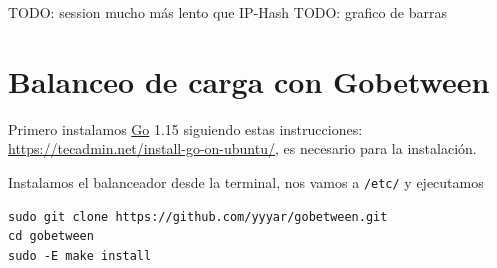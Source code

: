 \documentclass{article}
\begin{document}
TODO: session mucho más lento que IP-Hash
TODO: grafico de barras

\section{Balanceo de carga con Gobetween}

Primero instalamos \href{https://golang.org/}{Go} 1.15 siguiendo estas instrucciones:
\href{https://tecadmin.net/install-go-on-ubuntu/}{https://tecadmin.net/install-go-on-ubuntu/},
es necesario para la instalación.

Instalamos el balanceador desde la terminal, nos vamos a \texttt{/etc/} y ejecutamos
\begin{Verbatim}[tabsize=4]
sudo git clone https://github.com/yyyar/gobetween.git
cd gobetween
sudo -E make install
\end{Verbatim}
\end{document}
